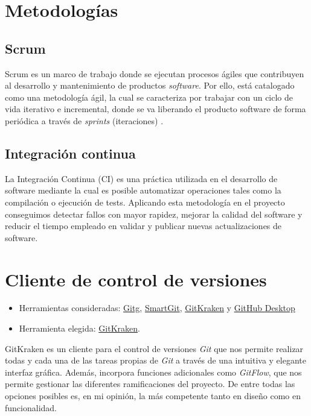 
\section{Metodologías}\label{metodologias}

\subsection{Scrum}\label{scrum}

Scrum es un marco de trabajo donde se ejecutan procesos ágiles que contribuyen al desarrollo y mantenimiento de productos \emph{software}. Por ello, está catalogado como una metodología ágil, la cual se caracteriza por trabajar con un ciclo de vida iterativo e incremental, donde se va liberando el producto software de forma periódica a través de \emph{sprints} (iteraciones) \cite{agile:scrum}.

\subsection{Integración continua}\label{scrum}

La Integración Continua (CI) es una práctica utilizada en el desarrollo de software mediante la cual es posible automatizar operaciones tales como la compilación o ejecución de tests. Aplicando esta metodología en el proyecto conseguimos detectar fallos con mayor rapidez, mejorar la calidad del software y reducir el tiempo empleado en validar y publicar nuevas actualizaciones de software. 


\section{Cliente de control de versiones}\label{ctr-ver}
\begin{itemize}
\tightlist
	\item Herramientas consideradas:
 		\href{https://wiki.gnome.org/Apps/Gitg/}{Gitg},
  		\href{https://www.syntevo.com/smartgit/}{SmartGit},
  		\href{https://www.gitkraken.com/}{GitKraken} y
  		\href{https://desktop.github.com/}{GitHub Desktop}
	\item Herramienta elegida: \href{https://www.gitkraken.com/}{GitKraken}.
\end{itemize}

GitKraken es un cliente para el control de versiones \emph{Git} que nos permite realizar todas y cada una de las tareas propias de \emph{Git} a través de una intuitiva y elegante interfaz gráfica. Además, incorpora funciones adicionales como \emph{GitFlow}, que nos permite gestionar las diferentes ramificaciones del proyecto. De entre todas las opciones posibles es, en mi opinión, la más competente tanto en diseño como en funcionalidad.

